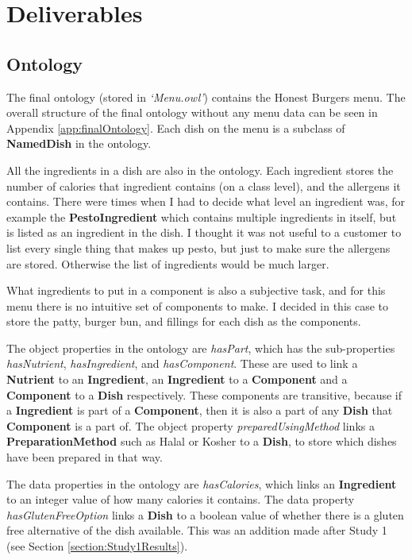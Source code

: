 \section{Deliverables}

\subsection{Ontology}

The final ontology (stored in \textit{`Menu.owl'}) contains the Honest Burgers \cite{honest_burgers_2023} menu. The overall structure of the final ontology without any menu data can be seen in Appendix \ref{app:finalOntology}. Each dish on the menu is a subclass of \textbf{NamedDish} in the ontology. 

All the ingredients in a dish are also in the ontology. Each ingredient stores the number of calories that ingredient contains (on a class level), and the allergens it contains. There were times when I had to decide what level an ingredient was, for example the \textbf{PestoIngredient} which contains multiple ingredients in itself, but is listed as an ingredient in the dish. I thought it was not useful to a customer to list every single thing that makes up pesto, but just to make sure the allergens are stored. Otherwise the list of ingredients would be much larger.

What ingredients to put in a component is also a subjective task, and for this menu there is no intuitive set of components to make. I decided in this case to store the patty, burger bun, and fillings for each dish as the components.

The object properties in the ontology are \textit{hasPart}, which has the sub-properties \textit{hasNutrient}, \textit{hasIngredient}, and \textit{hasComponent}. These are used to link a \textbf{Nutrient} to an \textbf{Ingredient}, an \textbf{Ingredient} to a \textbf{Component} and a \textbf{Component} to a \textbf{Dish} respectively. These components are transitive, because if a \textbf{Ingredient} is part of a \textbf{Component}, then it is also a part of any \textbf{Dish} that \textbf{Component} is a part of. The object property \textit{preparedUsingMethod} links a \textbf{PreparationMethod} such as Halal or Kosher to a \textbf{Dish}, to store which dishes have been prepared in that way.

The data properties in the ontology are \textit{hasCalories}, which links an \textbf{Ingredient} to an integer value of how many calories it contains. The data property \textit{hasGlutenFreeOption} links a \textbf{Dish} to a boolean value of whether there is a gluten free alternative of the dish available. This was an addition made after Study 1 (see Section \ref{section:Study1Results}).

